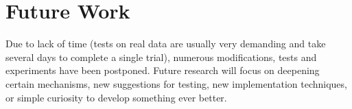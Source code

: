 \section{Future Work}
Due to lack of time (tests on real data are usually very demanding and take several days to complete a single trial), numerous modifications, tests and experiments have been postponed. Future research will focus on deepening certain mechanisms, new suggestions for testing, new implementation techniques, or simple curiosity to develop something ever better.

\newpage